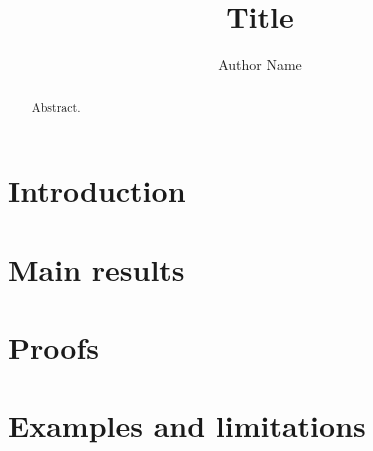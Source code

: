 \documentclass[11pt]{aomart}
\title{Title}
\author{Author Name}
\begin{document}
\maketitle
\begin{abstract}Abstract.\end{abstract}
\section{Introduction}
\section{Main results}
\section{Proofs}
\section{Examples and limitations}


\end{document}
